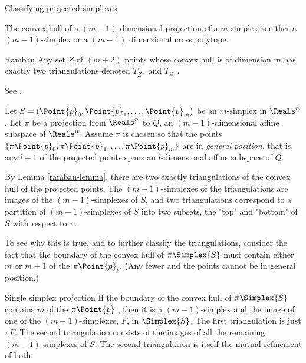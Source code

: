 \begin{plSection}{Classifying projected simplexes}
\label{sec:classifying}


The convex hull of a $(m-1)$ dimensional projection of a $m$-simplex
is either a $(m-1)$-simplex or a $(m-1)$ dimensional cross polytope.

\begin{plLemma}{Rambau}{}
\label{rambau-lemma}
Any set $Z$ of $(m+2)$ points whose convex hull is of dimension $m$
has exactly two triangulations denoted $T_{Z^+}$ and $T_{Z^-}$.
\end{plLemma}

See .

Let $S=(\Point{p}_0, \Point{p}_1, \ldots , \Point{p}_m)$ be an $m$-simplex in $\Reals^{n}$.
Let $\pi$ be a projection from $\Reals^{n}$ to $Q$, an $(m-1)$-dimensional
affine subspace of $\Reals^{n}$.
Assume $\pi$ is chosen so that the points
$\{\pi \Point{p}_0, \pi \Point{p}_1, \ldots , \pi \Point{p}_m\}$ are in {\it general position},
that is, any $l+1$ of the projected points spans an $l$-dimensional
affine subspace of $Q$.

By Lemma \ref{rambau-lemma},
there are two exactly triangulations of the convex hull of the projected points.
The $(m-1)$-simplexes of the triangulations are images of the $(m-1)$-simplexes of $S$,
and two triangulations correspond to a partition of $(m-1)$-simplexes of $S$
into two subsets, the "top" and "bottom" of $S$ with respect to $\pi$.

To see why this is true, and to further classify the triangulations,
consider the fact that the boundary of the convex hull of $\pi \Simplex{S}$
must contain either $m$ or $m+1$ of the $\pi \Point{p}_i$.
(Any fewer and the points cannot be in general position.)

\begin{plTheorem}{Single simplex projection}{}
\label{one-simplex-case}
If the boundary of the convex hull of $\pi \Simplex{S}$
contains $m$ of the $\pi \Point{p}_i$,
then it is a $(m-1)$-simplex
and the image of one of the $(m-1)$-simplexes, $F$, in $\Simplex{S}$.
The first triangulation is just $\pi F$.
The second triangulation consists of the images of
all the remaining $(m-1)$-simplexes of $S$.
The second triangulation is itself the mutual refinement of both.
\end{plTheorem}


\end{plSection}
